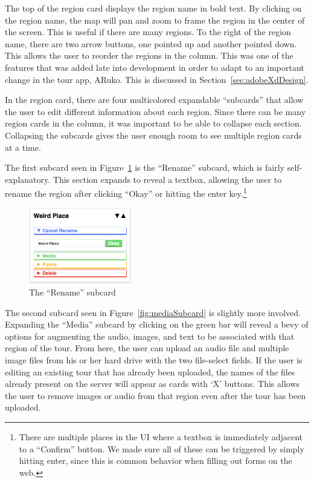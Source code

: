 \documentclass[a4paper, 10pt, american, titlepage]{article}
\begin{document}
The top of the region card displays the region name in bold text. By clicking
on the region name, the map will pan and zoom to frame the region in the center
of the screen. This is useful if there are many regions. To the right of the
region name, there are two arrow buttons, one pointed up and another pointed
down. This allows the user to reorder the regions in the column. This was one
of the features that was added late into development in order to adapt to an
important change in the tour app, ARuko. This is discussed in
Section~\ref{sec:adobeXdDesign}.

In the region card, there are four multicolored expandable ``subcards'' that
allow the user to edit different information about each region. Since there can
be many region cards in the column, it was important to be able to collapse
each section. Collapsing the subcards gives the user enough room to see
multiple region cards at a time.

The first subcard seen in Figure~\ref{fig:renameSubcard} is the ``Rename''
subcard, which is fairly self-explanatory.  This section expands to reveal a
textbox, allowing the user to rename the region after clicking ``Okay'' or
hitting the enter key.\footnote{There are multiple places in the UI where a
textbox is immediately adjacent to a ``Confirm'' button.  We made sure all of
these can be triggered by simply hitting enter, since this is common behavior
when filling out forms on the web.}

\begin{figure}[h]
	\centering
	\includegraphics[width=0.4\textwidth]{rename-subcard-editour.png}
	\caption{The ``Rename'' subcard}
	\label{fig:renameSubcard}
\end{figure}

The second subcard seen in Figure~\ref{fig:mediaSubcard} is slightly more
involved. Expanding the ``Media'' subcard by clicking on the green bar will
reveal a bevy of options for augmenting the audio, images, and text to be
associated with that region of the tour. From here, the user can upload an
audio file and multiple image files from his or her hard drive with the two
file-select fields. If the user is editing an existing tour that has already
been uploaded, the names of the files already present on the server will appear
as cards with `X' buttons. This allows the user to remove images or audio from
that region even after the tour has been uploaded.
\end{document}

